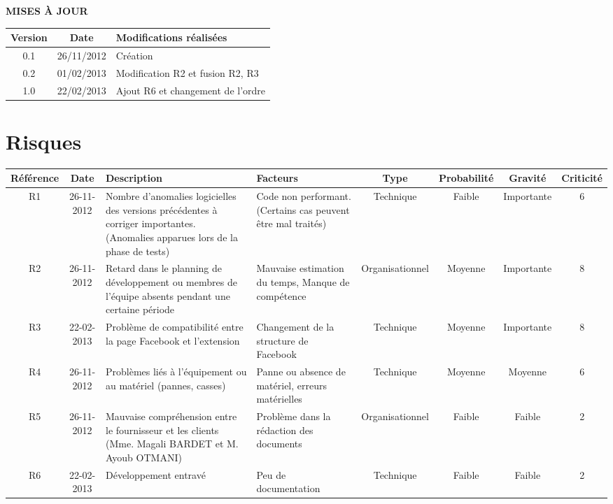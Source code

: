 \documentclass[a4paper,11pt,french]{article}
\begin{document}
\makeFirstPage
\clearpage
\vspace*{1cm}
\begin{center}
\textbf{\huge{MISES À JOUR}}\\
\vspace*{3cm}
	\begin{tabularx}{16cm}{|c|c|X|}
    \hline
	\bfseries{Version} & \bfseries{Date} & \bfseries{Modifications réalisées}\\
	\hline
	0.1 & 26/11/2012 & Création\\
	\hline
	0.2 & 01/02/2013 & Modification R2 et fusion R2, R3\\
	\hline
	1.0 & 22/02/2013 & Ajout R6 et changement de l'ordre\\
	\hline
	\end{tabularx}
\end{center}

\clearpage

\section{Risques}
\begin{flushleft}
\begin{small} 
\begin{tabularx}{18cm}{|c|c|p{2.28cm}|p{2cm}|c|c|c|c|}
\hline
\cellcolor[gray]{.7} Référence & \cellcolor[gray]{.7} Date & 
\cellcolor[gray]{.7}Description & \cellcolor[gray]{.7}Facteurs & 
\cellcolor[gray]{.7}Type & \cellcolor[gray]{.7}Probabilité & 
\cellcolor[gray]{.7}Gravité &
\cellcolor[gray]{.7}Criticité\\
\hline
R1 & 26-11-2012 & 
Nombre d'anomalies logicielles des versions précédentes
à  corriger importantes. (Anomalies apparues lors de la phase de tests)
& Code non performant. (Certains cas peuvent être mal traités)
& Technique & Faible & Importante & 6 \\
\hline
R2 & 26-11-2012 &
Retard dans le planning de
développement ou membres de l'équipe absents pendant une certaine période
& Mauvaise estimation du temps, Manque de compétence
& Organisationnel & Moyenne & Importante & 8 \\
\hline 
R3 & 22-02-2013 & Problème de compatibilité entre la page Facebook 
et l'extension
& Changement de la structure de Facebook
& Technique & Moyenne & Importante & 8 \\
\hline
R4 & 26-11-2012 &
Problèmes liés à l'équipement ou au matériel (pannes, casses)
& 
Panne ou absence de matériel, erreurs matérielles 
& Technique & Moyenne & Moyenne & 6 \\
\hline
R5 & 26-11-2012 & Mauvaise compréhension entre le
fournisseur et les clients (Mme. Magali BARDET et M. Ayoub OTMANI)
& Problème dans la rédaction des documents
& Organisationnel & Faible & Faible & 2 \\
\hline
R6 & 22-02-2013 & Développement entravé
& Peu de documentation
& Technique & Faible & Faible & 2 \\
\hline



\end{tabularx}

\end{small}
\end{flushleft}
\end{document}
